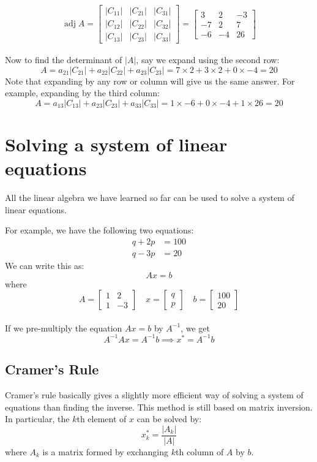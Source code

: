 \documentclass{./../../latex/handout}
\begin{document}
\[
\begin{aligned}
\operatorname{adj} A =\left[\begin{array}{ccc}
\left|C_{11}\right| & \left|C_{21}\right| & \left|C_{31}\right| \\
\left|C_{12}\right| & \left|C_{22}\right| & \left|C_{32}\right| \\
\left|C_{13}\right| & \left|C_{23}\right| & \left|C_{33}\right|
\end{array}\right] 
=\left[\begin{array}{ccc}
3 & 2 & -3 \\
-7 & 2 & 7 \\
-6 & -4 & 26
\end{array}\right]
\end{aligned}
\]

Now to find the determinant of $|A|$, say we expand using the second row:
\[A= a_{21} |C_{21}| + a_{22} |C_{22}| + a_{23} |C_{23}|  = 7\times 2 + 3 \times 2 + 0 \times -4 = 20\]
Note that expanding by any row or column will give us the same answer. For example, expanding by the third column:
\[A= a_{13} |C_{13}| + a_{23} |C_{23}| + a_{33} |C_{33}|  = 1\times -6 + 0 \times -4 + 1 \times 26 = 20\]


\section{Solving a system of linear equations}

All the linear algebra we have learned so far can be used to solve a system of linear equations. 

For example, we have the following two equations:
\begin{align*}
q + 2p &= 100 \\ q-3p &= 20
\end{align*}
We can write this as:
\[ Ax = b \]
where
\[A = \begin{bmatrix}
1 & 2 \\
1 & -3 
\end{bmatrix} \quad 
x = \begin{bmatrix}
q \\
p 
\end{bmatrix} \quad 
b = \begin{bmatrix}
100 \\
20 
\end{bmatrix}\] \\
If we pre-multiply the equation $Ax=b$ by $A^{-1}$, we get
\[ A^{-1}Ax=A^{-1}b  \implies x^* = A^{-1}b \] 

\subsection{Cramer's Rule}

Cramer's rule basically gives a slightly more efficient way of solving a system of equations than finding the inverse. This method is still based on matrix inversion. In particular, the $k$th element of $x$ can be solved by:
\[ x^*_k = \frac{|A_k|}{|A|} \]
where $A_k$ is a matrix formed by exchanging $k$th column of $A$ by $b$.
\end{document}
